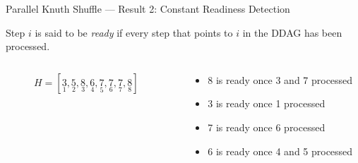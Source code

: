 \begin{frame}{Parallel Knuth Shuffle --- Result 2: Constant Readiness Detection}
  \begin{definition}[Ready]
    Step \(i\) is said to be \textit{ready} if every step that
    points to \(i\) in the DDAG has been processed.
  \end{definition}

  \begin{columns}
    \begin{column}{0.4\textwidth}
      \begin{figure}[ht]
        \centering
        \caption{\(H = [
          \underset{1}{3}, 
          \underset{2}{5}, 
          \underset{3}{8}, 
          \underset{4}{6}, 
          \underset{5}{7}, 
          \underset{6}{7}, 
          \underset{7}{7}, 
          \underset{8}{8} 
        ]\)}
      \end{figure}
    \end{column}
    \hfill
    \begin{column}{0.6\textwidth}
      \begin{itemize}
        \item 8 is ready once 3 and 7 processed
        \item 3 is ready once 1 processed
        \item 7 is ready once 6 processed
        \item 6 is ready once 4 and 5 processed
      \end{itemize}
    \end{column}
  \end{columns}
\end{frame}

